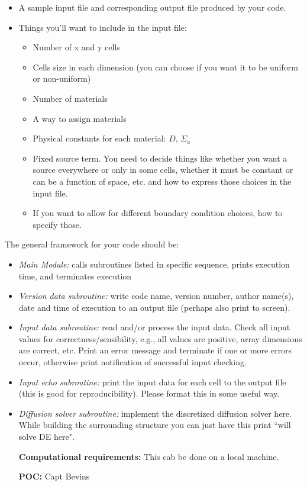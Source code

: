\documentclass[12pt, answers]{exam}
\begin{document}
\begin{questions}
\begin{itemize}
\item A sample input file and corresponding output file produced by your code.

\item Things you'll want to include in the input file:
  \begin{itemize}
  \item Number of x and y cells
  \item Cells size in each dimension (you can choose if you want it to be uniform or non-uniform)
  \item Number of materials
  \item A way to assign materials
  \item Physical constants for each material: $D$, $\Sigma_a$
  \item Fixed source term. You need to decide things like whether you want a source everywhere or only in some cells, whether it must be constant or can be a function of space, etc. and how to express those choices in the input file.
  \item If you want to allow for different boundary condition choices, how to specify those.
  \end{itemize}
  
\end{itemize}

The general framework for your code should be:
\begin{itemize}
\item \textit{Main Module:} calls subroutines listed in specific sequence, prints execution time, and terminates execution

\item \textit{Version data subroutine:} write code name, version number, author name(s), date and time of execution to an output file (perhaps also print to screen).

\item \textit{Input data subroutine:} read and/or process the input data. Check all input values for correctness/sensibility, e.g., all values are positive, array dimensions are correct, etc. Print an error message and terminate if one or more errors occur, otherwise print notification of successful input checking. 

\item \textit{Input echo subroutine:} print the input data for each cell to the output file (this is good for reproducibility). Please format this in some useful way.

\item \textit{Diffusion solver subroutine:} implement the discretized diffusion solver here. While building the surrounding structure you can just have this print ``will solve DE here". 

\textbf{Computational requirements:}
This cab be done on a local machine.

\textbf{POC:} Capt Bevins

\end{itemize}
\end{questions}
\end{document}
